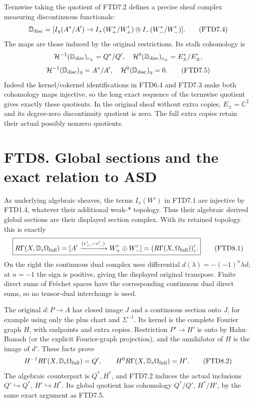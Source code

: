 Termwise taking the quotient of FTD7.2 defines a precise sheaf complex
measuring discontinuous functionals: \[
\mathbb D_{\rm disc}
=[I_\eta(A^*/A')\to
I_+(W_+^*/W_+')\oplus I_-(W_-^*/W_-')].
\tag{FTD7.4}
\] The maps are those induced by the original restrictions. Its stalk
cohomology is \[
\mathcal H^{-1}(\mathbb D_{\rm disc})_{c_\pm}=Q^*/Q',
\quad
\mathcal H^0(\mathbb D_{\rm disc})_{c_\pm}=E_\pm^*/E_\pm',
\] \[
\mathcal H^{-1}(\mathbb D_{\rm disc})_\eta=A^*/A',
\quad
\mathcal H^0(\mathbb D_{\rm disc})_\eta=0.
\tag{FTD7.5}
\] Indeed the kernel/cokernel identifications in FTD6.4 and FTD7.3 make
both cohomology maps injective, so the long exact sequence of the
termwise quotient gives exactly these quotients. In the original sheaf
without extra copies, \(E_\pm=\mathbb C^2\) and its degree-zero
discontinuity quotient is zero. The full extra copies retain their
actual possibly nonzero quotients.

\section{FTD8. Global sections and the exact relation to
ASD}\label{ftd8.-global-sections-and-the-exact-relation-to-asd}

As underlying algebraic sheaves, the terms \(I_x(W')\) in FTD7.1 are
injective by FTD1.4, whatever their additional weak-* topology. Thus
their algebraic derived global sections are their displayed section
complex. With its retained topology this is exactly \[
\boxed{
R\Gamma(X,\mathbb D_c\Omega_{\rm full})
=[A'\xrightarrow{(r_+',-r_-')}W_+'\oplus W_-']
=(R\Gamma(X,\Omega_{\rm full}))'_c.}
\tag{FTD8.1}
\] On the right the continuous dual complex uses differential
\(d(\lambda)=-(-1)^n\lambda d\); at \(n=-1\) the sign is positive,
giving the displayed original transpose. Finite direct sums of Fréchet
spaces have the corresponding continuous dual direct sums, so no
tensor-dual interchange is used.

The original \(d:P\to A\) has closed image \(J\) and a continuous
section onto \(J\), for example using only the plus chart and
\(\Sigma^{-1}\). Its kernel is the complete Fourier graph \(H\), with
endpoints and extra copies. Restriction \(P'\to H'\) is onto by
Hahn--Banach (or the explicit Fourier-graph projection), and the
annihilator of \(H\) is the image of \(d'\). These facts prove \[
H^{-1}R\Gamma(X,\mathbb D_c\Omega_{\rm full})=Q',
\qquad
H^0R\Gamma(X,\mathbb D_c\Omega_{\rm full})=H'.
\tag{FTD8.2}
\] The algebraic counterpart is \(Q^*,H^*\), and FTD7.2 induces the
actual inclusions \(Q'\hookrightarrow Q^*\), \(H'\hookrightarrow H^*\).
Its global quotient has cohomology \(Q^*/Q'\), \(H^*/H'\), by the same
exact argument as FTD7.5.

